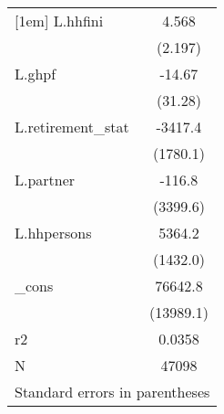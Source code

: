 \begin{tabular}{l*{1}{c}}
[1em]
L.hhfini    &       4.568\\
            &     (2.197)\\
[1em]
L.ghpf      &      -14.67\\
            &     (31.28)\\
[1em]
L.retirement\_stat&     -3417.4\\
            &    (1780.1)\\
[1em]
L.partner   &      -116.8\\
            &    (3399.6)\\
[1em]
L.hhpersons &      5364.2\\
            &    (1432.0)\\
[1em]
\_cons      &     76642.8\\
            &   (13989.1)\\
\hline
r2          &      0.0358\\
N           &       47098\\
\hline\hline
\multicolumn{2}{l}{\footnotesize Standard errors in parentheses}\\
\end{tabular}
